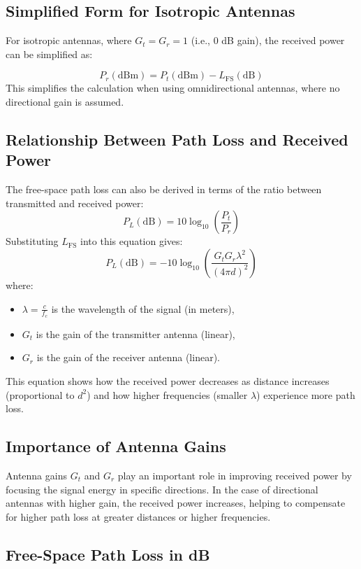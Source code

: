 \documentclass[a4paper,12pt]{book}
\begin{document}
	\subsection{Simplified Form for Isotropic Antennas}
	
	For isotropic antennas, where \( G_t = G_r = 1 \) (i.e., 0 dB gain), the received power can be simplified as:
	
	\[
	P_r (\text{dBm}) = P_t (\text{dBm}) - L_{\text{FS}} (\text{dB})
	\]
	This simplifies the calculation when using omnidirectional antennas, where no directional gain is assumed.
	
	\subsection{Relationship Between Path Loss and Received Power}
	
	The free-space path loss can also be derived in terms of the ratio between transmitted and received power:
	\[
	P_L (\text{dB}) = 10 \log_{10} \left( \frac{P_t}{P_r} \right)
	\]
	Substituting \(L_{\text{FS}}\) into this equation gives:
	\[
	P_L (\text{dB}) = -10 \log_{10} \left( \frac{G_t G_r \lambda^2}{(4 \pi d)^2} \right)
	\]
	where:
	\begin{itemize}
		\item \( \lambda = \frac{c}{f_c} \) is the wavelength of the signal (in meters),
		\item \( G_t \) is the gain of the transmitter antenna (linear),
		\item \( G_r \) is the gain of the receiver antenna (linear).
	\end{itemize}
	
	This equation shows how the received power decreases as distance increases (proportional to \(d^2\)) and how higher frequencies (smaller \(\lambda\)) experience more path loss.
	
	\subsection{Importance of Antenna Gains}
	
	Antenna gains \( G_t \) and \( G_r \) play an important role in improving received power by focusing the signal energy in specific directions. In the case of directional antennas with higher gain, the received power increases, helping to compensate for higher path loss at greater distances or higher frequencies.
	
	\subsection{Free-Space Path Loss in dB}
	
\end{document}
